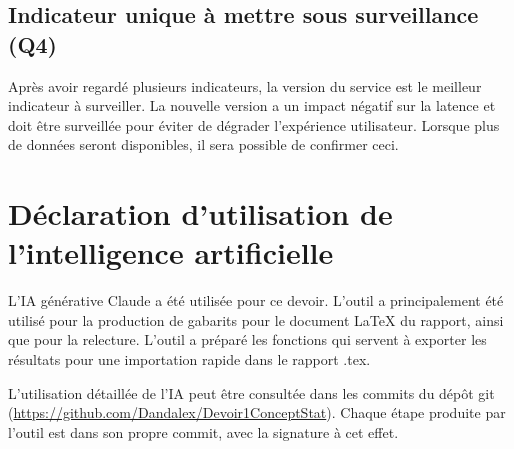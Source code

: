 \documentclass[11pt,letterpaper]{article}
\begin{document}
\subsection{Indicateur unique à mettre sous surveillance (Q4)}
Après avoir regardé plusieurs indicateurs, la version du service est le meilleur indicateur à surveiller.
La nouvelle version a un impact négatif sur la latence et doit être surveillée pour éviter de dégrader l'expérience utilisateur.
Lorsque plus de données seront disponibles, il sera possible de confirmer ceci.

\section*{Déclaration d'utilisation de l'intelligence artificielle}

L'IA générative Claude a été utilisée pour ce devoir.
L'outil a principalement été utilisé pour la production de gabarits pour le document LaTeX du rapport, ainsi que pour la relecture.
L'outil a préparé les fonctions qui servent à exporter les résultats pour une importation rapide dans le rapport .tex.

L'utilisation détaillée de l'IA peut être consultée dans les commits du dépôt git
(\url{https://github.com/Dandalex/Devoir1ConceptStat}).
Chaque étape produite par l'outil est dans son propre commit, avec la signature à cet effet.
\end{document}

